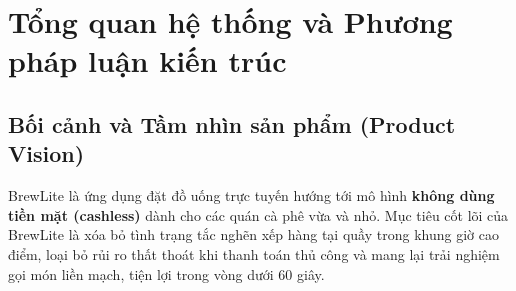 \documentclass[11pt, a4paper]{article}
\begin{document}
\vspace{10pt}



\section{Tổng quan hệ thống và Phương pháp luận kiến trúc}

\subsection{Bối cảnh và Tầm nhìn sản phẩm (Product Vision)}

BrewLite là ứng dụng đặt đồ uống trực tuyến hướng tới mô hình \textbf{không dùng tiền mặt (cashless)} dành cho các quán cà phê vừa và nhỏ. Mục tiêu cốt lõi của BrewLite là xóa bỏ tình trạng tắc nghẽn xếp hàng tại quầy trong khung giờ cao điểm, loại bỏ rủi ro thất thoát khi thanh toán thủ công và mang lại trải nghiệm gọi món liền mạch, tiện lợi trong vòng dưới 60 giây.
\end{document}
